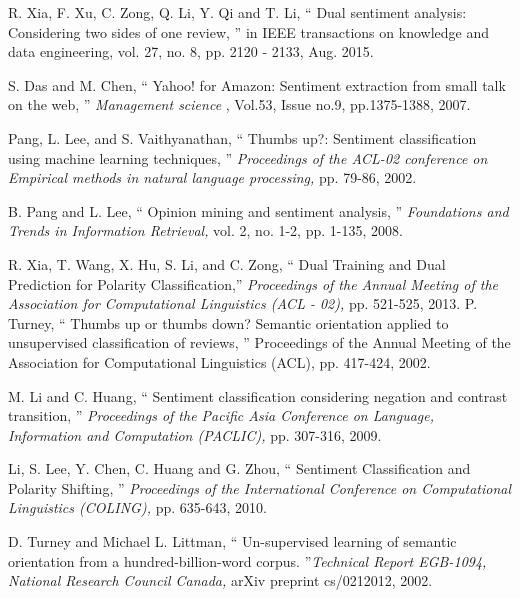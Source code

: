 \documentclass[oneside,a4paper,12pt]{pictreport}
\begin{document}
\begin{thebibliography}{1}



R. Xia, F. Xu, C. Zong, Q. Li, Y. Qi and T. Li, `` Dual sentiment analysis: Considering  two  sides  of  one 
review, '' in IEEE transactions on knowledge and data engineering, vol. 27, no. 8, pp. 2120
-
2133, Aug. 2015.

  S. Das and M. Chen, `` Yahoo! for Amazon: Sentiment extraction from small talk on the web, '' {\em Management science} , Vol.53, Issue no.9, pp.1375-1388, 2007.

  
  
  Pang, L. Lee, and S. Vaithyanathan, `` Thumbs up?: Sentiment classification using machine learning techniques, '' {\em Proceedings of the ACL-02 conference on Empirical methods in natural language processing,}
  pp. 79-86, 2002.
  
  B. Pang and L. Lee, `` Opinion mining and sentiment analysis, '' {\em Foundations
  and Trends in Information Retrieval,} vol. 2, no. 1-2, pp. 1-135, 2008.
  
  R. Xia, T. Wang, X. Hu, S. Li, and C. Zong, `` Dual Training and Dual
Prediction for Polarity Classification,'' {\em Proceedings of the Annual 
Meeting of the Association for Computational Linguistics (ACL - 02),} pp. 521-525,
2013.
  P. Turney, `` Thumbs up or thumbs down? Semantic orientation applied to unsupervised classification of reviews, '' Proceedings of the Annual Meeting of the Association for Computational Linguistics (ACL), pp. 417-424, 2002.

  
  M. Li and C. Huang, `` Sentiment classification considering negation
and contrast transition, '' {\em Proceedings of the Pacific Asia Conference on
Language, Information and Computation (PACLIC),}  pp. 307-316, 2009.


  Li, S. Lee, Y. Chen, C. Huang and G. Zhou, `` Sentiment 
  Classification and Polarity Shifting, '' {\em Proceedings of the International Conference on
  Computational Linguistics (COLING),} pp. 635-643, 2010.
  
 
  
  D. Turney and Michael L. Littman, `` Un-supervised learning of semantic orientation from
a hundred-billion-word corpus. ''{\em Technical Report
EGB-1094, National Research Council Canada,} arXiv preprint cs/0212012, 2002.


\end{thebibliography}
\end{document}

